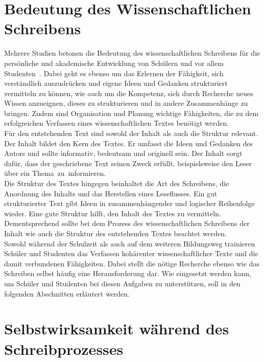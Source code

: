 \documentclass[../main.tex]{subfiles}
\begin{document}
\section{Bedeutung des Wissenschaftlichen Schreibens}
\label{sec:bedeutung}
Mehrere Studien betonen die Bedeutung des wissenschaftlichen Schreibens für die persönliche und akademische Entwicklung 
von Schülern und vor allem \mbox{Studenten \cite{influencingUsingAi,ZukunftWissenschaftlichesPublizieren}.} Dabei geht es ebenso um das Erlernen der Fähigkeit, sich verständlich auszudrücken und 
eigene Ideen und Gedanken strukturiert vermitteln zu können, wie auch um die Kompetenz, sich durch Recherche neues Wissen 
anzueignen, dieses zu strukturieren und in andere Zusammenhänge zu bringen.
Zudem sind Organisation und Planung wichtige Fähigkeiten, die zu dem erfolgreichen Verfassen eines wissenschaftlichen Textes benötigt werden.\cite{SelfEfficacyBeliefs} \\
Für den entstehenden Text sind sowohl der Inhalt als auch die Struktur relevant. Der Inhalt bildet den Kern des Textes. Er umfasst die Ideen und Gedanken des Autors und sollte 
informativ, bedeutsam und originell sein. Der Inhalt sorgt dafür, dass der geschriebene Text seinen Zweck erfüllt, beispielsweise 
den Leser über ein \mbox{Thema zu informieren.} \\
Die Struktur des Textes hingegen beinhaltet die Art des Schreibens, die Anordnung des Inhalts und das Herstellen eines Leseflusses. 
Ein gut strukturierter Text gibt Ideen in zusammenhängender und logischer Reihenfolge wieder. Eine gute Struktur hilft, den Inhalt des
Textes zu vermitteln. Dementsprechend sollte bei dem Prozess des wissenschaftlichen Schreibens der Inhalt wie auch die Struktur des entstehenden 
Textes beachtet werden. \cite{teachers}\\
Sowohl während der Schulzeit als auch auf dem weiteren Bildungsweg trainieren Schüler und Studenten das Verfassen kohärenter 
wissenschaftlicher Texte und die damit verbundenen Fähigkeiten. Dabei stellt die nötige Recherche ebenso wie das Schreiben selbst
häufig eine Herausforderung dar. Wie  eingesetzt werden kann, um Schüler und Studenten bei diesen Aufgaben zu 
unterstützen, soll in den folgenden Abschnitten erläutert werden. 

\section{Selbstwirksamkeit während des Schreibprozesses}
\label{sec:efficacy}
\end{document}
